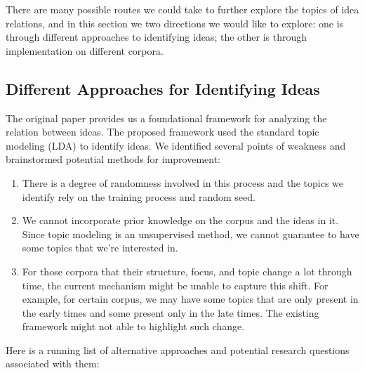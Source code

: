\documentclass{article}
\begin{document}
There are many possible routes we could take to further explore the topics of idea relations, and in this section we two directions we would like to explore: one is through different approaches to identifying ideas; the other is through implementation on different corpora. 

\subsection{Different Approaches for Identifying Ideas}
The original paper provides us a foundational framework for analyzing the relation between ideas. The proposed framework used the standard topic modeling (LDA) to identify ideas. We identified several points of weakness and brainstormed potential methods for improvement:

\begin{enumerate}
  \item There is a degree of randomness involved in this process and the topics we identify rely on the training process and random seed.
  \item We cannot incorporate prior knowledge on the corpus and the ideas in it. Since topic modeling is an unsupervised method, we cannot guarantee to have some topics that we're interested in. 
  \item For those corpora that their structure, focus, and topic change a lot through time, the current mechanism might be unable to capture this shift. For example, for certain corpus, we may have some topics that are only present in the early times and some present only in the late times. The existing framework might not able to highlight such change. 
\end{enumerate}

Here is a running list of alternative approaches and potential research questions associated with them: 
\end{document}
